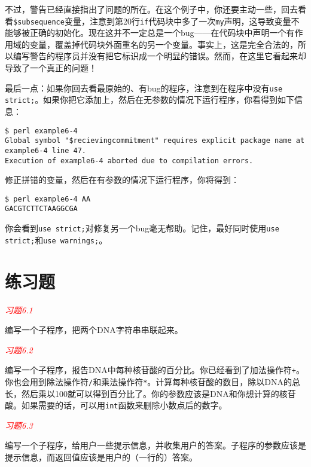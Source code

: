 不过，警告已经直接指出了问题的所在。在这个例子中，你还要主动一些，回去看看\verb|$subsequence|变量，注意到第20行\verb|if|代码块中多了一次\verb|my|声明，这导致变量不能够被正确的初始化。现在这并不一定总是一个bug——在代码块中声明一个有作用域的变量，覆盖掉代码块外面重名的另一个变量。事实上，这是完全合法的，所以编写警告的程序员并没有把它标识成一个明显的错误。然而，在这里它看起来却导致了一个真正的问题！

最后一点：如果你回去看最原始的、有bug的程序，注意到在程序中没有\verb|use strict;|。如果你把它添加上，然后在无参数的情况下运行程序，你看得到如下信息：

\begin{lstlisting}
$ perl example6-4   
Global symbol "$recievingcommitment" requires explicit package name at example6-4 line 47.
Execution of example6-4 aborted due to compilation errors.
\end{lstlisting}

修正拼错的变量，然后在有参数的情况下运行程序，你将得到：

\begin{lstlisting}
$ perl example6-4 AA
GACGTCTTCTAAGGCGA
\end{lstlisting}

你会看到\verb|use strict;|对修复另一个bug毫无帮助。记住，最好同时使用\verb|use strict;|和\verb|use warnings;|。

\section{练习题}
\textcolor{red}{\textit{习题6.1}}
\begin{adjustwidth}{2em}{}
编写一个子程序，把两个DNA字符串串联起来。
\end{adjustwidth}

\textcolor{red}{\textit{习题6.2}}
\begin{adjustwidth}{2em}{}
编写一个子程序，报告DNA中每种核苷酸的百分比。你已经看到了加法操作符\verb|+|。你也会用到除法操作符\verb|/|和乘法操作符\verb|*|。计算每种核苷酸的数目，除以DNA的总长，然后乘以100就可以得到百分比了。你的参数应该是DNA和你想计算的核苷酸。如果需要的话，可以用\verb|int|函数来删除小数点后的数字。
\end{adjustwidth}

\textcolor{red}{\textit{习题6.3}}
\begin{adjustwidth}{2em}{}
编写一个子程序，给用户一些提示信息，并收集用户的答案。子程序的参数应该是提示信息，而返回值应该是用户的（一行的）答案。
\end{adjustwidth}

